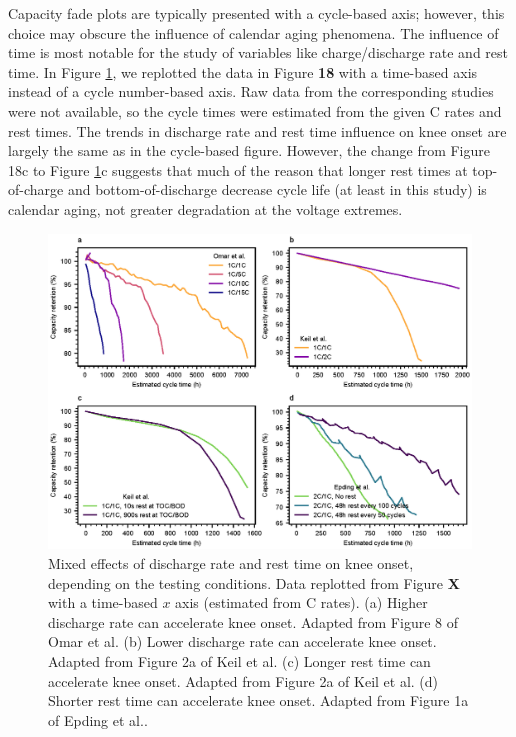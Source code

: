 \documentclass[journal=jpclcd,manuscript=article]{achemso}
\begin{document}
Capacity fade plots are typically presented with a cycle-based axis; however, this choice may obscure the influence of calendar aging phenomena. The influence of time is most notable for the study of variables like charge/discharge rate and rest time. 
In Figure \ref{fig:discharge-rest_time}, we replotted the data in Figure \textbf{18} 
with a time-based axis instead of a cycle number-based axis. Raw data from the corresponding studies were not available, so the cycle times were estimated from the given C rates and rest times. The trends in discharge rate and rest time influence on knee onset are largely the same as in the cycle-based figure. However, the change from Figure 18c
to Figure \ref{fig:discharge-rest_time}c suggests that much of the reason that longer rest times at top-of-charge and bottom-of-discharge decrease cycle life (at least in this study) is calendar aging, not greater degradation at the voltage extremes.    

\begin{figure}[ht]
\centering
\includegraphics[scale = 1.0]{figures/discharge_rate_rest_time.eps}
\caption{Mixed effects of discharge rate and rest time on knee onset, depending on the testing conditions.
Data replotted from Figure \textbf{X} with a time-based $x$ axis (estimated from C rates).
(a) Higher discharge rate can accelerate knee onset. Adapted from Figure 8 of Omar et al.\cite{omar_lithium_2014} (b) Lower discharge rate can accelerate knee onset. Adapted from Figure 2a of Keil et al.\cite{keil_linear_2019} (c) Longer rest time can accelerate knee onset. Adapted from  Figure 2a of Keil et al.\cite{keil_linear_2019} (d) Shorter rest time can accelerate knee onset. Adapted from Figure 1a of Epding et al.\cite{epding_investigation_2019}.}
\label{fig:discharge-rest_time}
\end{figure}
\end{document}
